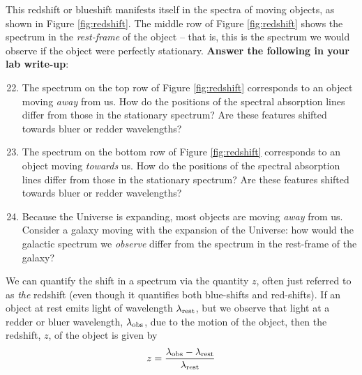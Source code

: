 \documentclass[11pt]{article}
\begin{document}
\medskip \noindent
This redshift or blueshift manifests itself in the spectra of moving objects, as shown in Figure \ref{fig:redshift}. The middle row of Figure \ref{fig:redshift} shows the spectrum in the \emph{rest-frame} of the object -- that is, this is the spectrum we would observe if the object were perfectly stationary. \textbf{Answer the following in your lab write-up}:

\begin{enumerate}
    \setcounter{enumi}{21}
    
    \item The spectrum on the top row of Figure \ref{fig:redshift} corresponds to an object moving \emph{away} from us. How do the positions of the spectral absorption lines differ from those in the stationary spectrum? Are these features shifted towards bluer or redder wavelengths?
    
    \item The spectrum on the bottom row of Figure \ref{fig:redshift} corresponds to an object moving \emph{towards} us. How do the positions of the spectral absorption lines differ from those in the stationary spectrum? Are these features shifted towards bluer or redder wavelengths?
    
    \item Because the Universe is expanding, most objects are moving \emph{away} from us. Consider a galaxy moving with the expansion of the Universe: how would the galactic spectrum we \emph{observe} differ from the spectrum in the rest-frame of the galaxy? 
\end{enumerate}


\medskip
We can quantify the shift in a spectrum via the quantity $z$, often just referred to as \emph{the} redshift (even though it quantifies both blue-shifts and red-shifts). If an object at rest emits light of wavelength $\lambda_{\rm rest}$, but we observe that light at a redder or bluer wavelength, $\lambda_{\rm obs}$, due to the motion of the object, then the redshift, $z$, of the object is given by
\begin{equation} \label{eq:redshift}
    z = \frac{\lambda_{\rm obs}-\lambda_{\rm rest}}{\lambda_{\rm rest}}
\end{equation}
\noindent
\end{document}
